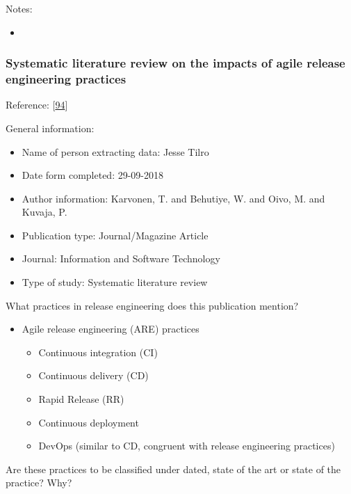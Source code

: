 \documentclass[]{book}
\providecommand{\tightlist}{%
  \setlength{\itemsep}{0pt}\setlength{\parskip}{0pt}}
\begin{document}
Notes:

\begin{itemize}
\item
\end{itemize}

\subsubsection{Systematic literature review on the impacts of agile
release engineering
practices}\label{systematic-literature-review-on-the-impacts-of-agile-release-engineering-practices}

Reference: {[}\protect\hyperlink{ref-karvonen2017a}{94}{]}

General information:

\begin{itemize}
\tightlist
\item
  Name of person extracting data: Jesse Tilro
\item
  Date form completed: 29-09-2018
\item
  Author information: Karvonen, T. and Behutiye, W. and Oivo, M. and
  Kuvaja, P.
\item
  Publication type: Journal/Magazine Article
\item
  Journal: Information and Software Technology
\item
  Type of study: Systematic literature review
\end{itemize}

What practices in release engineering does this publication mention?

\begin{itemize}
\tightlist
\item
  Agile release engineering (ARE) practices

  \begin{itemize}
  \tightlist
  \item
    Continuous integration (CI)
  \item
    Continuous delivery (CD)
  \item
    Rapid Release (RR)
  \item
    Continuous deployment
  \item
    DevOps (similar to CD, congruent with release engineering practices)
  \end{itemize}
\end{itemize}

Are these practices to be classified under dated, state of the art or
state of the practice? Why?
\end{document}

